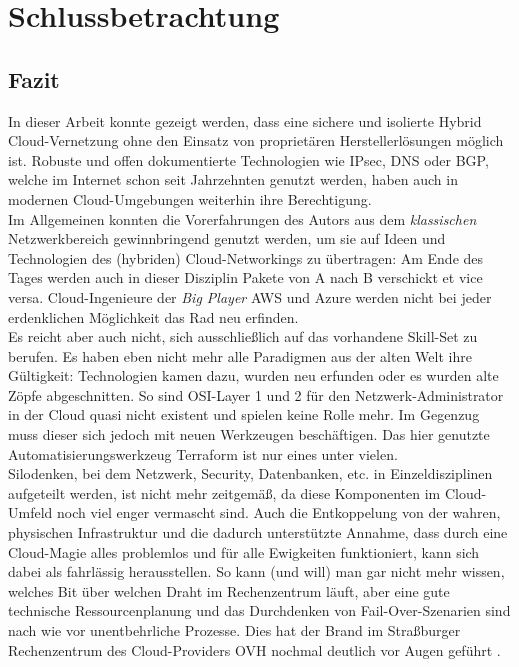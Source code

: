 \chapter{Schlussbetrachtung} \label{Fazit und Ausblick}

\section{Fazit}

In dieser Arbeit konnte gezeigt werden, dass eine sichere und isolierte Hybrid Cloud-Vernetzung ohne den Einsatz von proprietären Herstellerlösungen möglich ist. Robuste und offen dokumentierte Technologien wie IPsec, DNS oder BGP, welche im Internet schon seit Jahrzehnten genutzt werden, haben auch in \glqq modernen\grqq{} Cloud-Umgebungen weiterhin ihre Berechtigung.\\
Im Allgemeinen konnten die Vorerfahrungen des Autors aus dem \textit{klassischen} Netzwerkbereich gewinnbringend genutzt werden, um sie auf Ideen und Technologien des (hybriden) Cloud-Networkings zu übertragen: Am Ende des Tages werden auch in dieser Disziplin Pakete von A nach B verschickt et vice versa. Cloud-Ingenieure der \textit{Big Player} AWS und Azure werden nicht bei jeder erdenklichen Möglichkeit das Rad neu erfinden.\\
Es reicht aber auch nicht, sich ausschließlich auf das vorhandene Skill-Set zu berufen. Es haben eben nicht mehr alle Paradigmen aus der \glqq alten Welt\grqq{} ihre Gültigkeit: Technologien kamen dazu, wurden neu erfunden oder es wurden alte Zöpfe abgeschnitten. So sind OSI-Layer 1 und 2 für den Netzwerk-Administrator in der Cloud quasi nicht existent und spielen keine Rolle mehr. Im Gegenzug muss dieser sich jedoch mit neuen Werkzeugen beschäftigen. Das hier genutzte Automatisierungswerkzeug Terraform ist nur eines unter vielen.\\
Silodenken, bei dem Netzwerk, Security, Datenbanken, etc. in Einzeldisziplinen aufgeteilt werden, ist nicht mehr zeitgemäß, da diese Komponenten im Cloud-Umfeld noch viel enger vermascht sind. Auch die Entkoppelung von der \glqq wahren\grqq{}, physischen Infrastruktur und die dadurch unterstützte Annahme, dass durch eine \glqq Cloud-Magie\grqq{} alles problemlos und für alle Ewigkeiten funktioniert, kann sich dabei als fahrlässig herausstellen. So kann (und will) man gar nicht mehr wissen, \glqq welches Bit über welchen Draht im Rechenzentrum läuft\grqq{}, aber eine gute technische Ressourcenplanung und das Durchdenken von Fail-Over-Szenarien sind nach wie vor unentbehrliche Prozesse. Dies hat der Brand im Straßburger Rechenzentrum des Cloud-Providers OVH nochmal deutlich vor Augen geführt \cite{ChristofKerkmann2021}.\\
